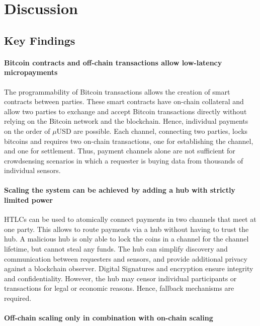 \section{Discussion}
\label{sec:trust-lessdiscussion}

\subsection{Key Findings}

\paragraph{Bitcoin contracts and off-chain transactions allow low-latency micropayments}

The programmability of Bitcoin transactions allows the creation of smart contracts between parties. These smart contracts have on-chain collateral and allow two parties to exchange and accept Bitcoin transactions directly without relying on the Bitcoin network and the blockchain. Hence, individual payments on the order of $\mu$USD are possible. Each channel, connecting two parties, locks bitcoins and requires two on-chain transactions, one for establishing the channel, and one for settlement. Thus, payment channels alone are not sufficient for crowdsensing scenarios in which a requester is buying data from thousands of individual sensors. 

\paragraph{Scaling the system can be achieved by adding a hub with strictly limited power}

\ac{HTLC}s can be used to atomically connect payments in two channels that meet at one party. This allows to route payments via a hub without having to trust the hub. A malicious hub is only able to lock the coins in a channel for the channel lifetime, but cannot steal any funds. The hub can simplify discovery and communication between requesters and sensors, and provide additional privacy against a blockchain observer. Digital Signatures and encryption ensure integrity and confidentiality. However, the hub may censor individual participants or transactions for legal or economic reasons. Hence, fallback mechanisms are required.

\paragraph{Off-chain scaling only in combination with on-chain scaling}

